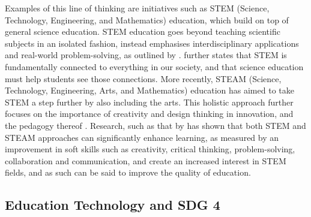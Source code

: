 Examples of this line of thinking are initiatives such as STEM (Science, Technology, Engineering, and Mathematics) education, which build on top of general science education. STEM education goes beyond teaching scientific subjects in an isolated fashion, instead emphasises interdisciplinary applications and real-world problem-solving, as outlined by \citet{bybee_case_2013, xie_stem_2015, blackley_stem_2015, abdi_tracing_2024}. \citet{deville_stem_2024} further states that STEM is fundamentally connected to everything in our society, and that science education must help students see those connections. More recently, STEAM (Science, Technology, Engineering, Arts, and Mathematics) education has aimed to take STEM a step further by also including the arts. This holistic approach further focuses on the importance of creativity and design thinking in innovation, and the pedagogy thereof \citep{marin-marin_steam_2021, dolgopolovas_computational_2021, connor_stem_2015, bequette_place_2012}. Research, such as that by \citet{jamali_role_2023, yakman_exploring_2012, samsudin_effect_2020} has shown that both STEM and STEAM approaches can significantly enhance learning, as measured by an improvement in soft skills such as creativity, critical thinking, problem-solving, collaboration and communication, and create an increased interest in STEM fields, and as such can be said to improve the quality of education.

\subsection{\label{sec:intro_et}Education Technology and SDG 4}%


